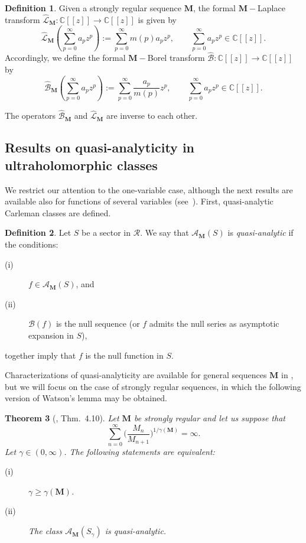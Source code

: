 \documentclass[11pt,a4paper,leqno]{article}
\theoremstyle{plain}
\newtheorem{theo}{Theorem}[section]
\theoremstyle{definition}
\newtheorem{defin}[theo]{Definition}
\def\C{\mathbb{C}}
\def\N{\mathbb{N}}
\def\ga{\gamma}
\def\bM{\boldsymbol{M}}
\begin{document}
\begin{defin}
Given a strongly regular sequence $\bM$, the formal $\bM-$Laplace transform $\hat{\mathcal{L}}_{\bM}:\C[[z]]\to\C[[z]]$ is given by
$$\hat{\mathcal{L}}_{\bM}\left(\sum_{p=0}^{\infty}a_{p}z^{p}\right):=\sum_{p=0}^{\infty}m(p)a_{p}z^{p},\qquad \sum_{p=0}^{\infty}a_{p}z^{p}\in\C[[z]].$$
Accordingly, we define the formal $\bM-$Borel transform $\hat{\mathcal{B}}:\C[[z]]\to\C[[z]]$ by
$$\hat{\mathcal{B}}_{\bM}\left(\sum_{p=0}^{\infty}a_{p}z^{p}\right):=\sum_{p=0}^{\infty}\frac{a_{p}}{m(p)}z^{p},\qquad \sum_{p=0}^{\infty}a_{p}z^{p}\in\C[[z]].$$
\end{defin}
The operators $\hat{\mathcal{B}}_{\bM}$ and $\hat{\mathcal{L}}_{\bM}$ are inverse to each other.


\subsection{Results on quasi-analyticity in ultraholomorphic classes}

We restrict our attention to the one-variable case, although the next results are available also for functions of several variables (see~\cite{lastrasanz1}). First, quasi-analytic Carleman classes are defined.

\begin{defin}
Let $S$ be a sector in $\mathcal{R}$.
We say that $\mathcal{A}_{\bM}(S)$ is \textit{quasi-analytic} if the conditions:
\begin{description}
\item[(i)] $f\in\mathcal{A}_{\bM}(S)$, and
\item[(ii)] $\mathcal{B}(f)$ is the null sequence (or $f$ admits the null series as asymptotic expansion in $S$),
\end{description}
together imply that $f$ is the null function in $S$.
\end{defin}

Characterizations of quasi-analyticity are available for general sequences $\bM$ in \cite{lastrasanz1}, but we will focus on the case of strongly regular sequences, in which the following version of Watson's lemma may be obtained.

\begin{theo}[\cite{lastrasanz1}, Thm.\ 4.10]\label{teorWatson}
Let $\bM$ be strongly regular and let us suppose that
\begin{equation}
\sum_{n=0}^{\infty}\Big(\frac{M_{n}}{M_{n+1}}\Big)^{1/\ga(\bM)} =\infty.\label{conditionWatson}
\end{equation}
Let $\gamma\in(0,\infty)$. The following statements are equivalent:
\begin{description}
\item[(i)] $\gamma\ge\gamma(\bM)$.
\item[(ii)] The class $\mathcal{A}_{\bM}(S_{\gamma})$ is quasi-analytic.
\end{description}
\end{theo}
\end{document}
